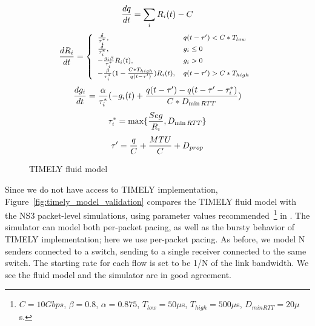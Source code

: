 \begin{figure}[h]
\fbox
{
\begin{minipage}{\columnwidth}
\begin{equation}
\small
\frac{{dq}}{{dt}} = \sum_{i} R_i(t) - C\\
\label{eq:timely_q}
\end{equation}
\begin{equation}
\small
\frac{{dR_i}}{{dt}} = \left\{ \begin{array}{ll}
\frac{\delta }{{\tau_i^*}}, & q(t - \tau ') < C*{T_{low}}\\
\frac{\delta }{{\tau_i^*}}, & g_i \le 0\\
 - \frac{{g_i\beta }}{{\tau_i^*}}R_i(t), & g_i > 0\\
 - \frac{\beta }{{\tau_i^*}}(1 - \frac{{C*{T_{high}}}}{{q(t - \tau ')}})R_i(t), & q(t - \tau ') > C*{T_{high}}
\end{array} \right.\\
\label{eq:timely_r}
\end{equation}
\begin{equation}
\small
\frac{{dg_i}}{{dt}} = \frac{\alpha }{{\tau_i^*}}( - g_i(t) + \frac{{q(t - \tau ') - q(t - \tau ' - \tau_i^*)}}{{C*{D_{\min RTT}}}})\\
\label{eq:timely_g}
\end{equation}
\begin{equation}
\small
\tau_i^* = \max \{ \frac{{Seg}}{R_i},{D_{\min RTT}}\} \\
\label{eq:timely_taus}
\end{equation}
\begin{equation}
\small
\tau ' = \frac{q}{C} + \frac{{MTU}}{C} + {D_{prop}}
\label{eq:timely_taup}
\end{equation}
\end{minipage}
}
\caption{TIMELY fluid model}
\vspace{-1em}
\label{fig:timely_model}
\end{figure}

Since we do not have access to TIMELY implementation,
Figure~\ref{fig:timely_model_validation} compares the TIMELY fluid model with
the NS3 packet-level simulations, using parameter values
recommended~\footnote{$C=10Gbps$, $\beta=0.8$, $\alpha=0.875$, $T_{low} =
50\mu$s, $T_{high} = 500\mu$s, $D_{minRTT}= 20 \mu$s.} in \cite{timely}. The
simulator can model both per-packet pacing, as well as the bursty behavior of
TIMELY implementation; here we use per-packet pacing. As before, we model N
senders connected to a switch, sending to a single receiver connected to the
same switch.  The starting rate for each flow is set to be 1/N of the link
bandwidth. We see the fluid model and the simulator are in good agreement.


